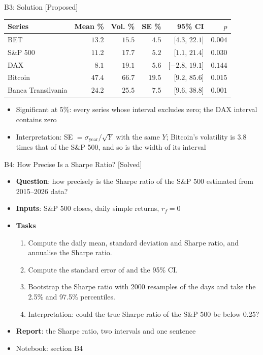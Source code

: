 \ifsolutions
\begin{frame}{B3: Solution [Proposed]}
\itemsize{\footnotesize}
\begin{center}
\footnotesize
\begin{tabular}{lrrrrr}
\toprule
Series & Mean \% & Vol. \% & SE \% & 95\% CI & $p$ \\
\midrule
BET & $13.2$ & $15.5$ & $4.5$ & [$4.3$, $22.1$] & $0.004$ \\
S\&P 500 & $11.2$ & $17.7$ & $5.2$ & [$1.1$, $21.4$] & $0.030$ \\
DAX & $8.1$ & $19.1$ & $5.6$ & [$-2.8$, $19.1$] & $0.144$ \\
Bitcoin & $47.4$ & $66.7$ & $19.5$ & [$9.2$, $85.6$] & $0.015$ \\
Banca Transilvania & $24.2$ & $25.5$ & $7.5$ & [$9.6$, $38.8$] & $0.001$ \\
\bottomrule
\end{tabular}
\end{center}
\begin{itemize}
    \item Significant at 5\%: every series whose interval excludes zero; the DAX interval contains zero
    \item Interpretation: SE $= \sigma_{\text{year}}/\sqrt{Y}$ with the same $Y$; Bitcoin's volatility is 3.8 times that of the S\&P 500, and so is the width of its interval
\end{itemize}
\end{frame}
\fi

\begin{frame}{B4: How Precise Is a Sharpe Ratio? [Solved]}
\itemsize{\footnotesize}
\begin{itemize}
\item \textbf{Question}: how precisely is the Sharpe ratio of the S\&P 500 estimated from 2015--2026 data?
\item \textbf{Inputs}: S\&P 500 closes, daily simple returns, $r_f = 0$
\item \textbf{Tasks}
\begin{enumerate}
    \item Compute the daily mean, standard deviation and Sharpe ratio, and annualise the Sharpe ratio.
    \item Compute the standard error of  and the 95\% CI.
    \item Bootstrap the Sharpe ratio with 2000 resamples of the days and take the 2.5\% and 97.5\% percentiles.
    \item Interpretation: could the true Sharpe ratio of the S\&P 500 be below 0.25?
\end{enumerate}
\item \textbf{Report}: the Sharpe ratio, two intervals and one sentence
\item Notebook: section B4
\end{itemize}
\end{frame}

